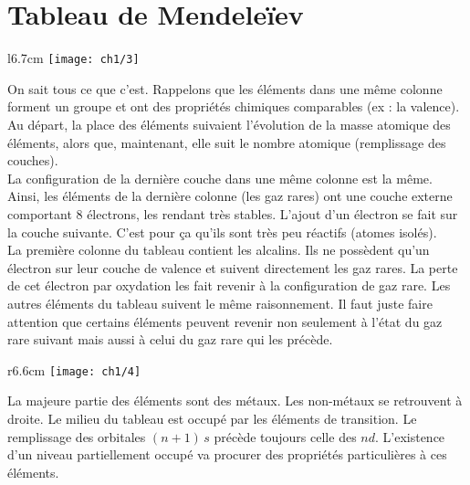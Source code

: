 \section{Tableau de Mendeleïev}
\begin{wrapfigure}[11]{l}{6.7cm}
	\vspace{-5mm}
	\texttt{[image: ch1/3]}
\end{wrapfigure}
On sait tous ce que c'est. Rappelons que les éléments dans une même colonne forment un groupe et ont des propriétés chimiques comparables (ex : la valence). Au départ, la place des éléments suivaient l'évolution de la masse atomique des éléments, alors que, maintenant, elle suit le nombre atomique (remplissage des couches).\\
La configuration de la dernière couche dans une même colonne est la même. Ainsi, les éléments de la dernière colonne (les gaz rares) ont une couche externe comportant 8 électrons, les rendant très stables. L'ajout d'un électron se fait sur la couche suivante. C'est pour ça qu'ils sont très peu réactifs (atomes isolés). \\
La première colonne du tableau contient les alcalins. Ils ne possèdent qu'un électron sur leur couche de valence et suivent directement les gaz rares. La perte de cet électron par oxydation les fait revenir à la configuration de gaz rare. Les autres éléments du tableau suivent le même raisonnement. Il faut juste faire attention que certains éléments peuvent revenir non seulement à l'état du gaz rare suivant mais aussi à celui du gaz rare qui les précède. \\
	
\begin{wrapfigure}[9]{r}{6.6cm}
	\vspace{-5mm}
	\texttt{[image: ch1/4]}
\end{wrapfigure}
La majeure partie des éléments sont des métaux. Les non-métaux se retrouvent à droite. Le milieu du tableau est occupé par les éléments de transition. Le remplissage des orbitales $(n+1) \, s$ précède toujours celle des $nd$. L'existence d'un niveau partiellement occupé va procurer des propriétés particulières à ces éléments.
	
	
	
	